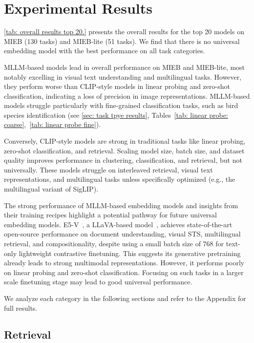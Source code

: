 \section{Experimental Results}
\label{sec: results}

\autoref{tab: overall results top 20.} presents the overall results for the top 20 models on MIEB (130 tasks) and MIEB-lite (51 tasks). We find that there is no universal embedding model with the best performance on all task categories.

MLLM-based models lead in overall performance on MIEB and MIEB-lite, most notably excelling in visual text understanding and multilingual tasks. However, they perform worse than CLIP-style models in linear probing and zero-shot classification, indicating a loss of precision in image representations. MLLM-based models struggle particularly with fine-grained classification tasks, such as bird species identification (see \autoref{sec: task tpye results}, Tables~\ref{tab: linear probe: coarse},~\ref{tab: linear probe fine}).

Conversely, CLIP-style models are strong in traditional tasks like linear probing, zero-shot classification, and retrieval. Scaling model size, batch size, and dataset quality improves performance in clustering, classification, and retrieval, but not universally. These models struggle on interleaved retrieval, visual text representations, and multilingual tasks unless specifically optimized (e.g., the multilingual variant of SigLIP).

The strong performance of MLLM-based embedding models and insights from their training recipes highlight a potential pathway for future universal embedding models. E5-V~\citep{jiang2024e5}, a LLaVA-based model~\citep{liu2023visual}, achieves state-of-the-art open-source performance on document understanding, visual STS, multilingual retrieval, and compositionality, despite using a small batch size of 768 for text-only lightweight contrastive finetuning. This suggests its generative pretraining already leads to strong multimodal representations. However, it performs poorly on linear probing and zero-shot classification. Focusing on such tasks in a larger scale finetuning stage may lead to good universal performance.

We analyze each category in the following sections and refer to the Appendix for full results.

\subsection{Retrieval}

